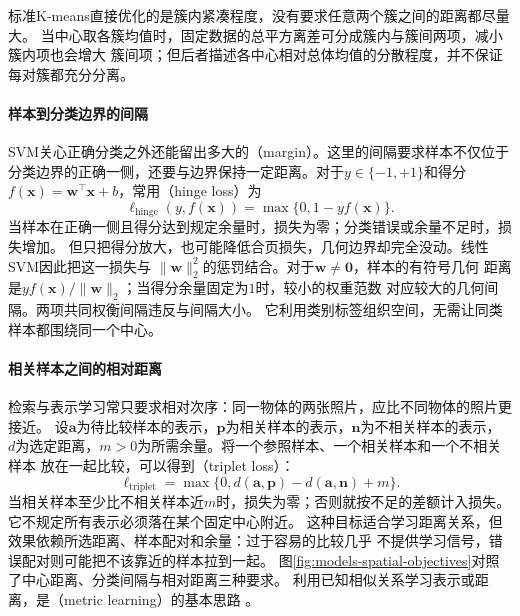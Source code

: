 标准K-means直接优化的是簇内紧凑程度，没有要求任意两个簇之间的距离都尽量大。
当中心取各簇均值时，固定数据的总平方离差可分成簇内与簇间两项，减小簇内项也会增大
簇间项；但后者描述各中心相对总体均值的分散程度，并不保证每对簇都充分分离。

\paragraph{样本到分类边界的间隔}

SVM关心正确分类之外还能留出多大的（margin）。这里的间隔要求样本不仅位于
分类边界的正确一侧，还要与边界保持一定距离。对于$y\in\{-1,+1\}$和得分
$f(\bm{x})=\bm{w}^{\top}\bm{x}+b$，常用（hinge loss）为
\begin{equation}
  \ell_{\mathrm{hinge}}(y,f(\bm{x}))
  =\max\{0,1-yf(\bm{x})\}.
  \label{eq:models-hinge}
\end{equation}
当样本在正确一侧且得分达到规定余量时，损失为零；分类错误或余量不足时，损失增加。
但只把得分放大，也可能降低合页损失，几何边界却完全没动。线性SVM因此把这一损失与
$\lVert\bm{w}\rVert_2^2$的惩罚结合。对于$\bm{w}\ne\bm{0}$，样本的有符号几何
距离是$yf(\bm{x})/\lVert\bm{w}\rVert_2$；当得分余量固定为$1$时，较小的权重范数
对应较大的几何间隔。两项共同权衡间隔违反与间隔大小。
它利用类别标签组织空间，无需让同类样本都围绕同一个中心。

\paragraph{相关样本之间的相对距离}

检索与表示学习常只要求相对次序：同一物体的两张照片，应比不同物体的照片更接近。
设$\bm{a}$为待比较样本的表示，$\bm{p}$为相关样本的表示，$\bm{n}$为不相关样本的表示，
$d$为选定距离，$m>0$为所需余量。将一个参照样本、一个相关样本和一个不相关样本
放在一起比较，可以得到（triplet loss）：
\begin{equation}
  \ell_{\mathrm{triplet}}
  =\max\{0,d(\bm{a},\bm{p})-d(\bm{a},\bm{n})+m\}.
  \label{eq:models-triplet}
\end{equation}
当相关样本至少比不相关样本近$m$时，损失为零；否则就按不足的差额计入损失。
它不规定所有表示必须落在某个固定中心附近。
这种目标适合学习距离关系，但效果依赖所选距离、样本配对和余量：过于容易的比较几乎
不提供学习信号，错误配对则可能把不该靠近的样本拉到一起。
图\ref{fig:models-spatial-objectives}对照了中心距离、分类间隔与相对距离三种要求。
利用已知相似关系学习表示或距离，是（metric learning）的基本思路
。

